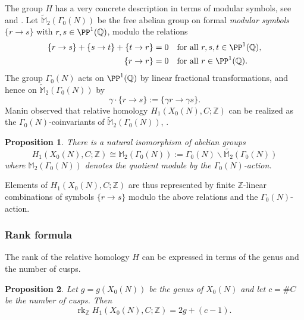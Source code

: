 \documentclass[10pt]{amsart}
\theoremstyle{theostyle}
\newtheorem{proposition}{Proposition}
\newcommand{\GG}{\Gamma}
\newcommand{\MM}{\mathbb{M}}
\newcommand{\QQ}{\mathbb{Q}} \newcommand{\RR}{\mathbb{R}}
\newcommand{\ZZ}{\mathbb{Z}}
\begin{document}
The group $H$ has a very concrete description in terms of modular symbols, see \cite[\S 2]{Gunnels:Notes} and \cite[\S 3.3]{Stein:ModularForms}. Let
$\widetilde{\MM}_2(\GG_0(N))$ be the free abelian group on formal {\it modular symbols} $\{r\to s\}$ with
$r,s\in\PP^1(\QQ)$, modulo the relations
\begin{align*}
	\{r\to s\} + \{s\to t\} + \{t\to r\} &= 0
	&&\text{for all } r,s,t\in \PP^1(\QQ), \\
	\{r\to r\} &= 0
	&&\text{for all } r\in \PP^1(\QQ).
\end{align*}
The group $\Gamma_0(N)$ acts on $\PP^1(\QQ)$ by linear fractional
transformations, and hence on $\widetilde{\MM}_2(\GG_0(N))$ by
\[
\gamma\cdot\{r\to s\} := \{\gamma r \to \gamma s\}.
\]
Manin observed that relative homology $H_1(X_0(N),C;\ZZ)$ can be realized
as the $\Gamma_0(N)$-coinvariants of $\widetilde{\MM}_2(\GG_0(N))$, \cite{Manin:ParabPts}.

\begin{proposition}
	There is a natural isomorphism of abelian groups
	\[
	H_1(X_0(N),C;\ZZ) \cong \MM_2(\GG_0(N)) := \GG_0(N)\backslash\widetilde{\MM_2}(\GG_0(N))
	\]
	where $\MM_2(\GG_0(N))$ %
	denotes the quotient module by the $\GG_0(N)$-action.
\end{proposition}

Elements of $H_1(X_0(N),C;\ZZ)$ are thus represented by finite $\ZZ$-linear
combinations of symbols $\{r\to s\}$ modulo the above relations and the
$\Gamma_0(N)$-action. 

\subsubsection*{Rank formula}

The rank of the relative homology $H$ can be expressed in terms of the genus
and the number of cusps.

\begin{proposition}
	Let $g=g(X_0(N))$ be the genus of $X_0(N)$ and let $c=\#C$ be the number of
	cusps. Then
	\[
	\mathrm{rk}_\ZZ\; H_1(X_0(N),C;\ZZ) = 2g + (c-1).
	\]
\end{proposition}
\end{document}
